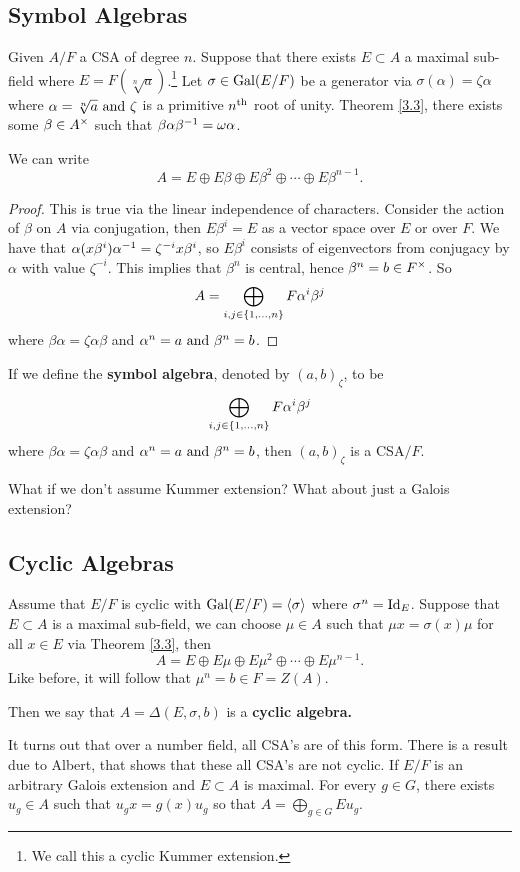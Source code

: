 \subsection{Symbol Algebras}
Given $A/F$ a CSA of degree $n$. Suppose that there exists $E \subset A$ a maximal sub-field where $E = F(\sqrt[n]{a})$.\footnote{We call this a cyclic Kummer extension.} Let $\sigma \in \operatorname{Gal} (E/F)$ be a generator via $\sigma (\alpha) = \zeta \alpha$ where $\alpha = \sqrt[n]{a} \text{ and } \zeta$ is a primitive $n^{\text{th}}$ root of unity. Theorem \ref{3.3}, there exists some $\beta \in A^{\times}$ such that $\beta \alpha\beta^{-1} = \omega \alpha$. 
\begin{lemma}\label{3.14}
We can write $$A = E \oplus E\beta\oplus E\beta^2 \oplus \cdots \oplus E\beta^{n-1}.$$
\end{lemma}
\begin{proof}
This is true via the linear independence of characters. Consider the action of $\beta$ on $A$ via conjugation, then $E\beta^i = E$ as a vector space over $E$ or over $F$. We have that $\alpha (x\beta^i)\alpha^{-1} = \zeta^{-i}x\beta^i$, so $E\beta^i$ consists of eigenvectors from conjugacy by $\alpha$ with value $\zeta^{-i}$. This implies that $\beta^n$ is central, hence $\beta^n = b \in F^{\times}$. So 
$$A = \bigoplus_{i,j \in \left\lbrace 1,\dots , n \right\rbrace}F\alpha^i\beta^j$$
where $\beta \alpha = \zeta \alpha \beta$ and $\alpha^n = a \text{ and } \beta^n = b$. 
\end{proof}
\begin{defn}\label{3.15}
If we define the \textbf{symbol algebra}, denoted by $(a,b)_{\zeta}$, to be 
$$\bigoplus_{i,j \in \left\lbrace 1,\dots , n \right\rbrace}F\alpha^i\beta^j$$
where $\beta \alpha = \zeta \alpha \beta$ and $\alpha^n = a \text{ and } \beta^n = b$, then $(a,b)_{\zeta}$ is a CSA$/F$.
\end{defn}
What if we don't assume Kummer extension? What about just a Galois extension?
\subsection{Cyclic Algebras}
Assume that $E/F$ is cyclic with $\operatorname{Gal}(E/F) = \langle \sigma \rangle$ where $\sigma^n = \operatorname{Id}_E$. Suppose that $E\subset A$ is a maximal sub-field, we can choose $\mu \in A$ such that $\mu x= \sigma (x)\mu$ for all $x \in E$ via Theorem \ref{3.3}, then 
$$A = E \oplus E\mu \oplus E\mu^2 \oplus \cdots \oplus E\mu^{n-1}.$$
Like before, it will follow that $\mu^n  = b \in F = Z(A)$. 
\begin{defn}\label{3.17}
Then we say that $A = \Delta (E,\sigma,b)$ is a \textbf{cyclic algebra.}
\end{defn} 
It turns out that over a number field, all CSA's are of this form. There is a result due to Albert, that shows that these all CSA's are not cyclic. If $E/F$ is an arbitrary Galois extension and $E \subset A$ is maximal. For every $g \in G$, there exists $u_g \in A$ such that $u_gx = g(x)u_g$ so that $A  = \bigoplus_{g\in G}Eu_g$.